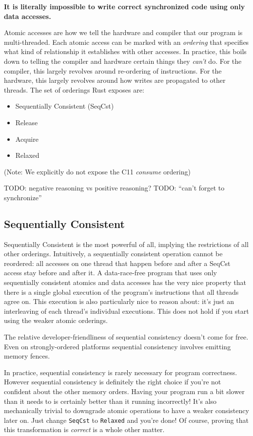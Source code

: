 \documentclass[a4paper,]{book}
\providecommand{\tightlist}{%
  \setlength{\itemsep}{0pt}\setlength{\parskip}{0pt}}
\begin{document}
\textbf{It is literally impossible to write correct synchronized code
using only data accesses.}

Atomic accesses are how we tell the hardware and compiler that our
program is multi-threaded. Each atomic access can be marked with an
\emph{ordering} that specifies what kind of relationship it establishes
with other accesses. In practice, this boils down to telling the
compiler and hardware certain things they \emph{can't} do. For the
compiler, this largely revolves around re-ordering of instructions. For
the hardware, this largely revolves around how writes are propagated to
other threads. The set of orderings Rust exposes are:

\begin{itemize}
\tightlist
\item
  Sequentially Consistent (SeqCst)
\item
  Release
\item
  Acquire
\item
  Relaxed
\end{itemize}

(Note: We explicitly do not expose the C11 \emph{consume} ordering)

TODO: negative reasoning vs positive reasoning? TODO: ``can't forget to
synchronize''

\subsection{Sequentially Consistent}\label{sequentially-consistent}

Sequentially Consistent is the most powerful of all, implying the
restrictions of all other orderings. Intuitively, a sequentially
consistent operation cannot be reordered: all accesses on one thread
that happen before and after a SeqCst access stay before and after it. A
data-race-free program that uses only sequentially consistent atomics
and data accesses has the very nice property that there is a single
global execution of the program's instructions that all threads agree
on. This execution is also particularly nice to reason about: it's just
an interleaving of each thread's individual executions. This does not
hold if you start using the weaker atomic orderings.

The relative developer-friendliness of sequential consistency doesn't
come for free. Even on strongly-ordered platforms sequential consistency
involves emitting memory fences.

In practice, sequential consistency is rarely necessary for program
correctness. However sequential consistency is definitely the right
choice if you're not confident about the other memory orders. Having
your program run a bit slower than it needs to is certainly better than
it running incorrectly! It's also mechanically trivial to downgrade
atomic operations to have a weaker consistency later on. Just change
\texttt{SeqCst} to \texttt{Relaxed} and you're done! Of course, proving
that this transformation is \emph{correct} is a whole other matter.
\end{document}
